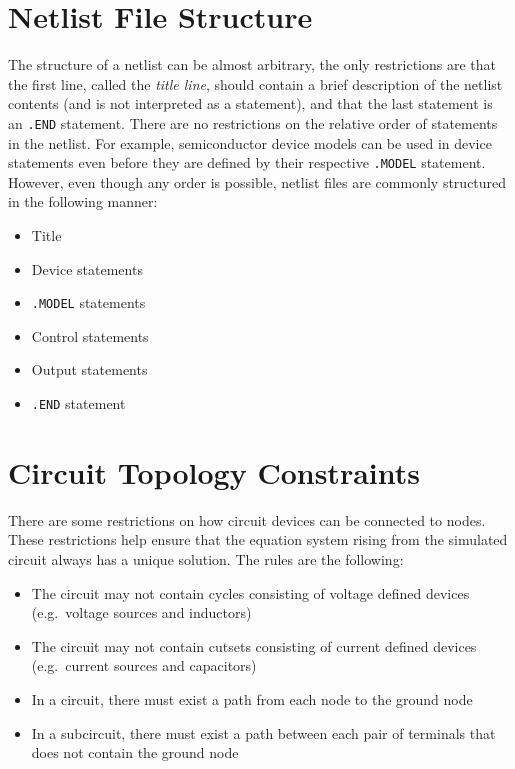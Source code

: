 

\section{Netlist File Structure}
The structure of a netlist can be almost arbitrary, the only restrictions are that the first line, called the \textit{title line}, should contain a brief description of the netlist contents (and is not interpreted as a statement), and that the last statement is an \texttt{.END} statement. There are no restrictions on the relative order of statements in the netlist. For example, semiconductor device models can be used in device statements even before they are defined by their respective \texttt{.MODEL} statement. However, even though any order is possible, netlist files are commonly structured in the following manner:

\begin{itemize}
	\item Title
	\item Device statements
	\item \texttt{.MODEL} statements
	\item Control statements
	\item Output statements
	\item \texttt{.END} statement
\end{itemize}

\section{Circuit Topology Constraints}
\label{chap:spicecode:topology}

There are some restrictions on how circuit devices can be connected to nodes. These restrictions help ensure that the equation system rising from the simulated circuit always has a unique solution. The rules are the following:

\begin{itemize}
	\item The circuit may not contain cycles consisting of voltage defined devices (e.g.\ voltage sources and inductors)
	\item The circuit may not contain cutsets consisting of current defined devices (e.g.\ current sources and capacitors)
	\item In a circuit, there must exist a path from each node to the ground node
	\item In a subcircuit, there must exist a path between each pair of terminals that does not contain the ground node 
\end{itemize}
